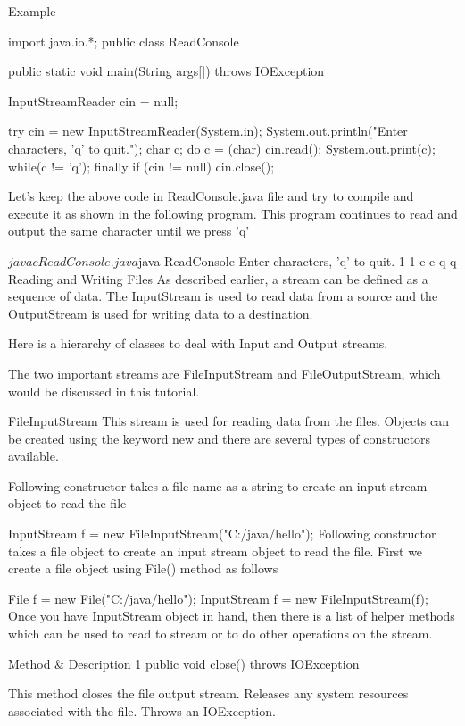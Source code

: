 Example

import java.io.*;
public class ReadConsole {

   public static void main(String args[]) throws IOException {
      InputStreamReader cin = null;

      try {
         cin = new InputStreamReader(System.in);
         System.out.println("Enter characters, 'q' to quit.");
         char c;
         do {
            c = (char) cin.read();
            System.out.print(c);
         } while(c != 'q');
      }finally {
         if (cin != null) {
            cin.close();
         }
      }
   }
}
Let's keep the above code in ReadConsole.java file and try to compile and execute it as shown in the following program. This program continues to read and output the same character until we press 'q'

$javac ReadConsole.java
$java ReadConsole
Enter characters, 'q' to quit.
1
1
e
e
q
q
Reading and Writing Files
As described earlier, a stream can be defined as a sequence of data. The InputStream is used to read data from a source and the OutputStream is used for writing data to a destination.

Here is a hierarchy of classes to deal with Input and Output streams.



The two important streams are FileInputStream and FileOutputStream, which would be discussed in this tutorial.

FileInputStream
This stream is used for reading data from the files. Objects can be created using the keyword new and there are several types of constructors available.

Following constructor takes a file name as a string to create an input stream object to read the file

InputStream f = new FileInputStream("C:/java/hello");
Following constructor takes a file object to create an input stream object to read the file. First we create a file object using File() method as follows

File f = new File("C:/java/hello");
InputStream f = new FileInputStream(f);
Once you have InputStream object in hand, then there is a list of helper methods which can be used to read to stream or to do other operations on the stream.

 	Method & Description
1
public void close() throws IOException{}

This method closes the file output stream. Releases any system resources associated with the file. Throws an IOException.

